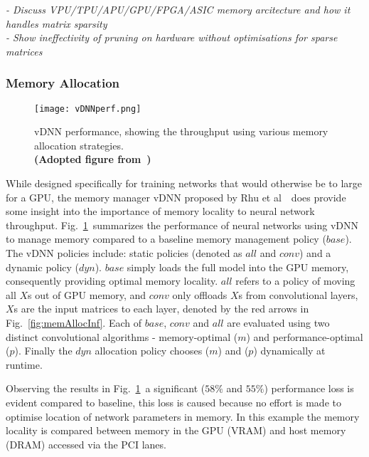 \documentclass[../../D1.tex]{subfiles}
\begin{document}
\emph{
- Discuss VPU/TPU/APU/GPU/FPGA/ASIC memory arcitecture and how it handles matrix sparsity\\
- Show ineffectivity of pruning on hardware without optimisations for sparse matrices\\
}


\subsubsection{Memory Allocation}\label{sec:MemAlloc}
\begin{figure}[H]
    \texttt{[image: vDNNperf.png]} 
    \caption{vDNN performance, showing the throughput using various memory allocation strategies. \\ \textbf{(Adopted figure from~\autocite{rhuVDNNVirtualizedDeep2016})}}
    \label{fig:vDNNperf}   
\end{figure}
While designed specifically for training networks that would otherwise be to large for a GPU, the memory manager vDNN proposed by Rhu et al~\autocite{rhuVDNNVirtualizedDeep2016}~does provide some insight into the importance of memory locality to neural network throughput.
Fig.~\ref{fig:vDNNperf}~summarizes the performance of neural networks using vDNN to manage memory compared to a baseline memory management policy ($base$). The vDNN policies include: static policies (denoted as $all$ and $conv$) and a dynamic policy ($dyn$).
$base$ simply loads the full model into the GPU memory, consequently providing optimal memory locality. $all$ refers to a policy of moving all $X$s out of GPU memory, and $conv$ only offloads $X$s from convolutional layers, $X$s are the input matrices to each layer, denoted by the red arrows in Fig.~\ref{fig:memAllocInf}.
Each of $base$, $conv$ and $all$ are evaluated using two distinct convolutional algorithms - memory-optimal ($m$) and performance-optimal ($p$).
Finally the $dyn$ allocation policy chooses ($m$) and ($p$) dynamically at runtime.

Observing the results in Fig.~\ref{fig:vDNNperf}~a significant ($58\%$ and $55\%$) performance loss is evident compared to baseline, this loss is caused because no effort is made to optimise location of network parameters in memory. In this example the memory locality is compared between memory in the GPU (VRAM) and host memory (DRAM) accessed via the PCI lanes.
\end{document}
